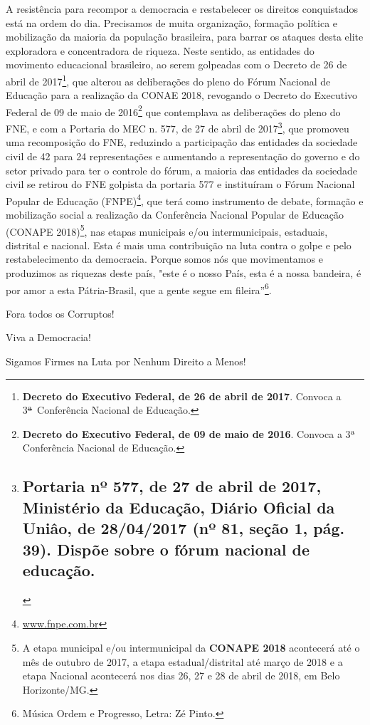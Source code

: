 A resistência para recompor a democracia e restabelecer os direitos
conquistados está na ordem do dia. Precisamos de muita organização,
formação política e mobilização da maioria da população brasileira, para
barrar os ataques desta elite exploradora e concentradora de riqueza.
Neste sentido, as entidades do movimento educacional brasileiro, ao
serem golpeadas com o Decreto de 26 de abril de 2017\footnote{\textbf{Decreto
  do Executivo Federal, de 26 de abril de 2017}. Convoca a
  3\sout{ª}~Conferência Nacional de Educação.}, que alterou as
deliberações do pleno do Fórum Nacional de Educação para a realização da
CONAE 2018, revogando o Decreto do Executivo Federal de 09 de maio de
2016\footnote{\textbf{Decreto do Executivo Federal, de 09 de maio de
  2016}. Convoca a 3ª Conferência Nacional de Educação.} que contemplava
as deliberações do pleno do FNE, e com a Portaria do MEC n. 577, de 27
de abril de 2017\footnote{\section{ Portaria nº 577, de 27 de abril de
  2017, Ministério da Educação, Diário Oficial da Uniâo, de 28/04/2017
  (nº 81, seção 1, pág. 39). Dispõe sobre o fórum nacional de
  educação.}\label{portaria-nuxba-577-de-27-de-abril-de-2017-ministuxe9rio-da-educauxe7uxe3o-diuxe1rio-oficial-da-uniuxe2o-de-28042017-nuxba-81-seuxe7uxe3o-1-puxe1g.-39.-dispuxf5e-sobre-o-fuxf3rum-nacional-de-educauxe7uxe3o.}},
que promoveu uma recomposição do FNE, reduzindo a participação das
entidades da sociedade civil de 42 para 24 representações e aumentando a
representação do governo e do setor privado para ter o controle do
fórum, a maioria das entidades da sociedade civil se retirou do FNE
golpista da portaria 577 e instituíram o Fórum Nacional Popular de
Educação (FNPE)\footnote{\href{http://www.fnpe.com.br}{www.fnpe.com.br}},
que terá como instrumento de debate, formação e mobilização social a
realização da Conferência Nacional Popular de Educação (CONAPE
2018)\footnote{A etapa municipal e/ou intermunicipal da \textbf{CONAPE
  2018} acontecerá até o mês de outubro de 2017, a etapa
  estadual/distrital até março de 2018 e a etapa Nacional acontecerá nos
  dias 26, 27 e 28 de abril de 2018, em Belo Horizonte/MG.}, nas etapas
municipais e/ou intermunicipais, estaduais, distrital e nacional. Esta é
mais uma contribuição na luta contra o golpe e pelo restabelecimento da
democracia. Porque somos nós que movimentamos e produzimos as riquezas
deste país, "este é o nosso País, esta é a nossa bandeira, é por amor a
esta Pátria-Brasil, que a gente segue em fileira''\footnote{Música Ordem
  e Progresso, Letra: Zé Pinto.}.

Fora todos os Corruptos!

Viva a Democracia!

Sigamos Firmes na Luta por Nenhum Direito a Menos!

